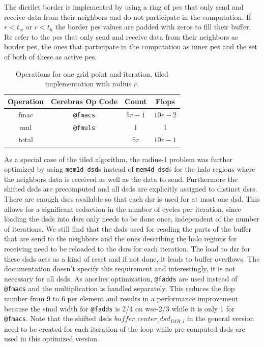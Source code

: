 The dicrilet border is implemented by using a ring of \acp{pe} that only send and receive data from their neighbors and do not participate in the computation. If $r<t_w$ or $r<t_h$ the border \acp{pe} values are padded with zeros to fill their buffer. Re refer to the \acp{pe} that only send and receive data from their neighbors as border \acp{pe}, the ones that participate in the computation as inner \acp{pe} and the set of both of these as active \acp{pe}.

\begin{table}[h]
    \centering
    \caption{Operations for one grid point and iteration, tiled implementation with radius $r$.}
    \label{tab:tiled_operations}
    \begin{tabular}{@{}cccc@{}}
        \toprule
        Operation & Cerebras Op Code & Count & Flops \\
        \midrule
        fmac & \texttt{@fmacs} & $5r-1$ & $10r-2$ \\
        mul & \texttt{@fmuls} & \num{1} & \num{1} \\
        \midrule
        total & & $5r$ & $10r-1$ \\
        \bottomrule
    \end{tabular}
\end{table}

As a special case of the tiled algorithm, the radius-1 problem was further optimized by using \texttt{mem1d\_dsd}s instead of \texttt{mem4d\_dsd}s for the halo regions where the neighbors data is received as well as the data to send. Furthermore the shifted \acp{dsd} are precomputed and all \acp{dsd} are explicitly assigned to distinct \acp{dsr}. There are enough \acp{dsr} available so that each \ac{dsr} is used for at most one \ac{dsd}. This allows for a significant reduction in the number of cycles per iteration, since loading the \acp{dsd} into \acp{dsr} only needs to be done once, independent of the number of iterations. We still find that the \acp{dsd} used for reading the parts of the buffer that are send to the neighbors and the ones describing the halo regions for receiving need to be reloaded to the \acp{dsr} for each iteration. The load to \ac{dsr} for these \acp{dsd} acts as a kind of reset and if not done, it leads to buffer overflows. The documentation doesn't specify this requirement and interestingly, it is not necessary for all \acp{dsd}. 
As another optimization, \texttt{@fadds} are used instead of \texttt{@fmacs} and the multiplication is handled separately. This reduces the flop number from $9$ to $6$ per element and results in a performance improvement because the simd width for \texttt{@fadds} is 2/4 on wse-2/3 while it is only 1 for \texttt{@fmacs}. Note that the shifted \acp{dsd} $buffer\_center\_dsd_{DIR,i}$ in the general version need to be created for each iteration of the loop while pre-computed \acp{dsd} are used in this optimized version.

